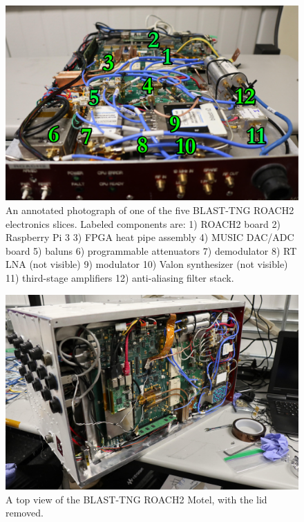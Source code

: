 \begin{figure}
\centering
\includegraphics[width=\textwidth]{figures/readout/hardware/roach_slice_annotated}
\caption[~An annotated photograph of one of the five BLAST-TNG ROACH2 electronics slices.]{An annotated photograph of one of the five BLAST-TNG ROACH2 electronics slices. Labeled components are: 1) ROACH2 board 2) Raspberry Pi 3 3) FPGA heat pipe assembly 4) MUSIC DAC/ADC board 5) baluns 6) programmable attenuators 7) demodulator 8) RT LNA (not visible) 9) modulator 10) Valon synthesizer (not visible) 11) third-stage amplifiers 12) anti-aliasing filter stack.}
\label{fig:if slice}
\end{figure}

\begin{figure}[!htbp]
\centering
\includegraphics[width=\textwidth]{figures/readout/hardware/roach_motel_open}
\caption[~A top view of the BLAST-TNG ROACH2 Motel, with the lid removed.]{A top view of the BLAST-TNG ROACH2 Motel, with the lid removed.}
\label{fig:top roach}
\end{figure}

